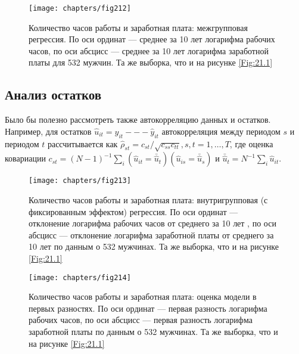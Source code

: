  \begin{figure}[ht]
                \begin{center}
                    \texttt{[image: chapters/fig212]}
                    \caption{Количество часов работы и заработная плата: межгрупповая регрессия. По оси ординат --- среднее за 10 лет логарифма рабочих часов, по оси абсцисс  --- среднее за 10 лет логарифма заработной платы для 532 мужчин. Та же выборка, что и на рисунке \ref{Fig:21.1}}
                    \label{Fig:21.2}
                \end{center}
     \end{figure}

\subsection{Анализ остатков}

Было бы полезно рассмотреть также автокорреляцию данных и остатков. Например, для остатков $\hat{u}_{it}=y_{it} --- \hat{y}_{it}$ автокорреляция между периодом $s$ и периодом $t$ рассчитывается как $\hat{\rho}_{st} = c_{st}/\sqrt{c_{ss} c_{tt}}, s, t = 1, \dots, T$, где оценка ковариации  $c_{st}=(N-1)^{-1} \sum_i (\hat{u}_{it} = \bar{\hat{u}}_t)(\hat{u}_{is} = \bar{\hat{u}}_s)$ и $\bar{\hat{u}}_t= N^{-1} \sum_i \hat{u}_{it}$.

 \begin{figure}[ht]
                \begin{center}
                    \texttt{[image: chapters/fig213]}
                    \caption{Количество часов работы и заработная плата: внутригрупповая (с фиксированным эффектом) регрессия. По оси ординат --- отклонение логарифма рабочих часов от среднего за 10 лет , по оси абсцисс --- отклонение логарифма заработной платы от среднего за 10 лет  по данным о 532 мужчинах. Та же выборка, что и на рисунке \ref{Fig:21.1}}
                    \label{Fig:21.3}
                \end{center}
     \end{figure}

 \begin{figure}[ht]
                \begin{center}
                    \texttt{[image: chapters/fig214]}
                    \caption{Количество часов работы и заработная плата: оценка модели в первых разностях. По оси ординат --- первая разность логарифма рабочих часов, по оси абсцисс --- первая разность логарифма заработной платы по данным о 532 мужчинах. Та же выборка, что и на рисунке \ref{Fig:21.1}}
                    \label{Fig:21.4}
                \end{center}
     \end{figure}

